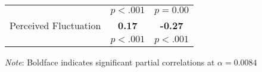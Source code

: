 \begin{table}
\begin{threeparttable}
\begin{tabular}[t]{rcc}
\hspace{1em} & $p<.001$ & $ p= 0.00 $\\
\hspace{1em}Perceived Fluctuation & \textbf{ 0.17 } & \textbf{ -0.27 }\\
\hspace{1em} & $p<.001$ & $p<.001$\\
\bottomrule
\end{tabular}
\begin{tablenotes}
\small
\item [] \emph{Note}: Boldface indicates significant partial correlations at $\alpha=0.0084$
\end{tablenotes}
\end{threeparttable}
\end{table}

